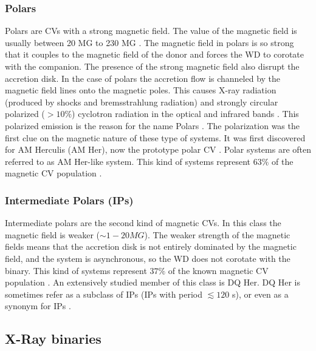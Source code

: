 \subsubsection{Polars}

Polars are CVs with a strong magnetic field. The value of the magnetic field is usually between 20 MG to 230  MG \citep{balman_x-ray_2012}. The magnetic field in polars is so strong that it couples to the magnetic field of the donor and forces the WD to corotate with the companion. The presence of the strong magnetic field also disrupt the accretion disk. In the case of polars the accretion flow is channeled by the magnetic field lines onto the magnetic poles. This causes X-ray radiation (produced by shocks and bremsstrahlung radiation)  and strongly circular polarized ($> 10 \%$) cyclotron radiation in the optical and infrared bands \citep{cropper_polars_1990}. This polarized emission is the reason for the name Polars \citep{krzeminski_extremely_1977}. The polarization was the first clue on the magnetic nature of these type of systems. It was first discovered for AM Herculis (AM Her), now the prototype polar CV \citep{tapia_discovery_1977}. Polar systems are often referred to as AM Her-like system. This kind of systems represent $63 \%$ of the magnetic CV population \citep{balman_x-ray_2012}.

\subsubsection{Intermediate Polars (IPs)}

Intermediate polars are the second kind of magnetic CVs. In this class the magnetic field is weaker ($\sim 1-20 MG$). The weaker strength of the magnetic fields means that the accretion disk is not entirely dominated by the magnetic field, and the system is asynchronous, so the WD does not corotate with the binary. This kind of systems represent $37 \%$ of the known magnetic CV population \citep{balman_x-ray_2012}. An extensively studied member of this class is DQ Her. DQ Her is sometimes refer as a subclass of IPs (IPs with period $\lesssim 120 $ s), or even as a synonym for IPs \citep{patterson_dq_1994,warner_cataclysmic_2003}.  



\subsection{X-Ray binaries}

